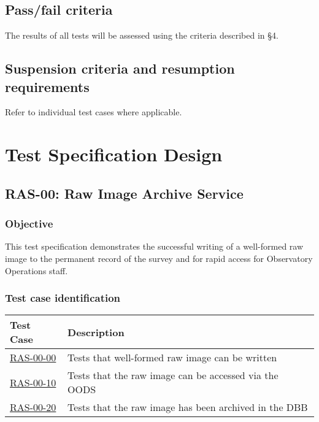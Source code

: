 \documentclass[DM,lsstdraft,STS,toc]{lsstdoc}
\begin{document}
\subsection{Pass/fail criteria}
\label{sec:passfail}


The results of all tests will be assessed using the criteria described in
 \S4.




\subsection{Suspension criteria and resumption requirements}
\label{suspension}


Refer to individual test cases where applicable.


\section{Test Specification Design}
\label{sec:Test Specification Design}
\subsection{RAS-00: Raw Image Archive Service}


\subsubsection{Objective}
This test specification demonstrates the successful writing of a
well-formed raw image to the permanent record of the survey and
for rapid access for Observatory Operations staff.


\subsubsection{Test case identification}


\begin{longtable} {|p{}|p{}|}\hline
\textbf{Test Case} & \textbf{Description} \\\hline
\hyperref[ras-00-00]{RAS-00-00} & Tests that well-formed raw image can be written \\\hline
\hyperref[ras-00-10]{RAS-00-10} & Tests that the raw image can be accessed via the OODS \\\hline
\hyperref[ras-00-20]{RAS-00-20} & Tests that the raw image has been archived in the DBB \\\hline
\end{longtable}
\end{document}
